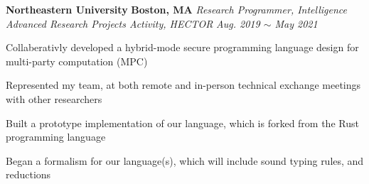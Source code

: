 \item
\headerrow
{\textbf{Northeastern University}}
{\textbf{Boston, MA}}
\headerrow
{\emph{Research Programmer, Intelligence Advanced Research Projects Activity,
 HECTOR}}
{\emph{Aug. 2019 $\sim$ May 2021}}
\begin{itemize*}
    \item Collaberativly developed a hybrid-mode secure programming language
    design for multi-party computation (MPC)
    \item Represented my team, at both remote and in-person technical exchange
    meetings with other researchers
    \item Built a prototype implementation of our language, which is forked
    from the Rust programming language
    \item Began a formalism for our language(s), which will include sound
    typing rules, and reductions
\end{itemize*}
